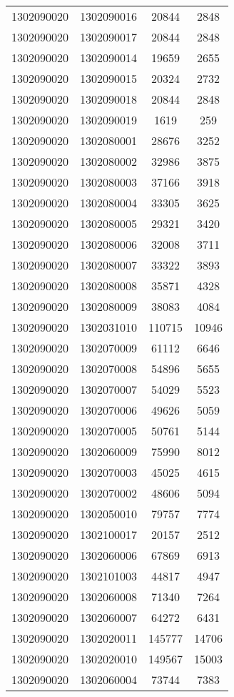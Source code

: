 \begin{longtable}{llcc}
1302090020 & 1302090016 & 20844 & 2848\\
1302090020 & 1302090017 & 20844 & 2848\\
1302090020 & 1302090014 & 19659 & 2655\\
1302090020 & 1302090015 & 20324 & 2732\\
1302090020 & 1302090018 & 20844 & 2848\\
1302090020 & 1302090019 & 1619 & 259\\
1302090020 & 1302080001 & 28676 & 3252\\
1302090020 & 1302080002 & 32986 & 3875\\
1302090020 & 1302080003 & 37166 & 3918\\
1302090020 & 1302080004 & 33305 & 3625\\
1302090020 & 1302080005 & 29321 & 3420\\
1302090020 & 1302080006 & 32008 & 3711\\
1302090020 & 1302080007 & 33322 & 3893\\
1302090020 & 1302080008 & 35871 & 4328\\
1302090020 & 1302080009 & 38083 & 4084\\
1302090020 & 1302031010 & 110715 & 10946\\
1302090020 & 1302070009 & 61112 & 6646\\
1302090020 & 1302070008 & 54896 & 5655\\
1302090020 & 1302070007 & 54029 & 5523\\
1302090020 & 1302070006 & 49626 & 5059\\
1302090020 & 1302070005 & 50761 & 5144\\
1302090020 & 1302060009 & 75990 & 8012\\
1302090020 & 1302070003 & 45025 & 4615\\
1302090020 & 1302070002 & 48606 & 5094\\
1302090020 & 1302050010 & 79757 & 7774\\
1302090020 & 1302100017 & 20157 & 2512\\
1302090020 & 1302060006 & 67869 & 6913\\
1302090020 & 1302101003 & 44817 & 4947\\
1302090020 & 1302060008 & 71340 & 7264\\
1302090020 & 1302060007 & 64272 & 6431\\
1302090020 & 1302020011 & 145777 & 14706\\
1302090020 & 1302020010 & 149567 & 15003\\
1302090020 & 1302060004 & 73744 & 7383\\

\end{longtable}
